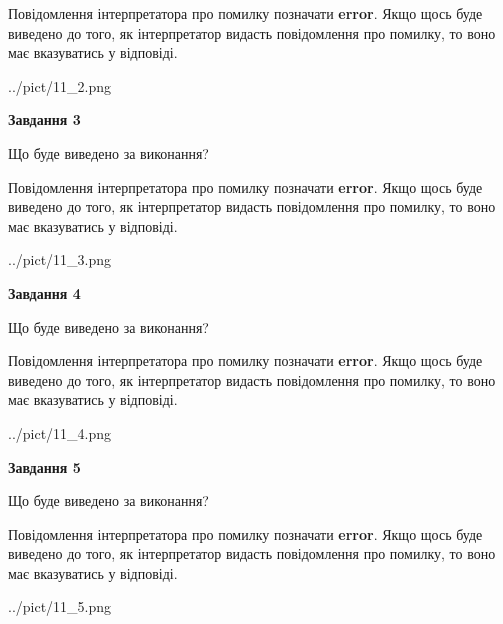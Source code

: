 \documentclass[12pt, ukrainian]{article}
\begin{document}
{\begin {large}
Повідомлення інтерпретатора про помилку позначати \textbf{error}.
Якщо щось буде виведено до того, як інтерпретатор видасть повідомлення про помилку, 
то воно має вказуватись у відповіді. \par


\begin{center}
	{../pict/11_2.png}
\end{center}
\newpage

{\begin {center}\textbf{Завдання 3}\end {center}}\par
Що буде виведено за виконання?

Повідомлення інтерпретатора про помилку позначати \textbf{error}.
Якщо щось буде виведено до того, як інтерпретатор видасть повідомлення про помилку, 
то воно має вказуватись у відповіді. \par


\begin{center}
	{../pict/11_3.png}
\end{center}
\newpage

{\begin {center}\textbf{Завдання 4}\end {center}}\par
Що буде виведено за виконання?

Повідомлення інтерпретатора про помилку позначати \textbf{error}.
Якщо щось буде виведено до того, як інтерпретатор видасть повідомлення про помилку, 
то воно має вказуватись у відповіді. \par


\begin{center}
	{../pict/11_4.png}
\end{center}
\newpage

{\begin {center}\textbf{Завдання 5}\end {center}}\par
Що буде виведено за виконання?

Повідомлення інтерпретатора про помилку позначати \textbf{error}.
Якщо щось буде виведено до того, як інтерпретатор видасть повідомлення про помилку, 
то воно має вказуватись у відповіді. \par


\begin{center}
	{../pict/11_5.png}
\end{center}
\newpage


\end{large}}
\end{document}
